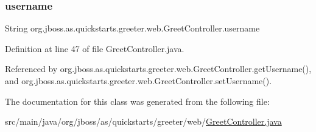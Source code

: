 \subsubsection{\texorpdfstring{username}{username}}
{\footnotesize\ttfamily String org.\+jboss.\+as.\+quickstarts.\+greeter.\+web.\+Greet\+Controller.\+username\hspace{0.3cm}{\ttfamily [private]}}



Definition at line 47 of file Greet\+Controller.\+java.



Referenced by org.\+jboss.\+as.\+quickstarts.\+greeter.\+web.\+Greet\+Controller.\+get\+Username(), and org.\+jboss.\+as.\+quickstarts.\+greeter.\+web.\+Greet\+Controller.\+set\+Username().



The documentation for this class was generated from the following file\+:\begin{DoxyCompactItemize}
\item 
src/main/java/org/jboss/as/quickstarts/greeter/web/\hyperlink{_greet_controller_8java}{Greet\+Controller.\+java}\end{DoxyCompactItemize}
